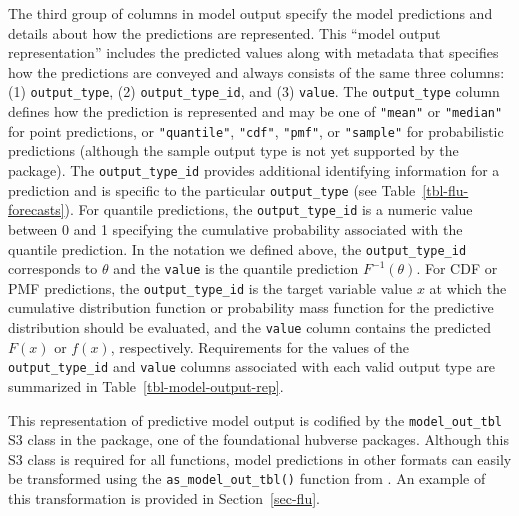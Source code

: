 \documentclass[
  article,
  shortnames,
  notitle]{jss}
\begin{document}
\begin{longtable}[]
\caption{\label{tbl-example-scenarios}Example of scenario projections
for incident COVID-19 cases, formatted according to hubverse standards.
Quantile predictions for the median and 50\% prediction intervals from a
single model are shown for four distinct scenarios. The
\texttt{location} and \texttt{origin\_date} columns have been omitted
for brevity; all forecasts in this example were made on 2021-03-07 for
the US. This example is a subset of the \texttt{scenario\_outputs} data
provided by the  package.}

\tabularnewline
\end{longtable}

The third group of columns in model output specify the model predictions
and details about how the predictions are represented. This ``model
output representation'' includes the predicted values along with
metadata that specifies how the predictions are conveyed and always
consists of the same three columns: (1) \texttt{output\_type}, (2)
\texttt{output\_type\_id}, and (3) \texttt{value}. The
\texttt{output\_type} column defines how the prediction is represented
and may be one of \texttt{"mean"} or \texttt{"median"} for point
predictions, or \texttt{"quantile"}, \texttt{"cdf"}, \texttt{"pmf"}, or
\texttt{"sample"} for probabilistic predictions (although the sample
output type is not yet supported by the  package). The
\texttt{output\_type\_id} provides additional identifying information
for a prediction and is specific to the particular \texttt{output\_type}
(see Table~\ref{tbl-flu-forecasts}). For quantile predictions, the
\texttt{output\_type\_id} is a numeric value between 0 and 1 specifying
the cumulative probability associated with the quantile prediction. In
the notation we defined above, the \texttt{output\_type\_id} corresponds
to \(\theta\) and the \texttt{value} is the quantile prediction
\(F^{-1}(\theta)\). For CDF or PMF predictions, the
\texttt{output\_type\_id} is the target variable value \(x\) at which
the cumulative distribution function or probability mass function for
the predictive distribution should be evaluated, and the \texttt{value}
column contains the predicted \(F(x)\) or \(f(x)\), respectively.
Requirements for the values of the \texttt{output\_type\_id} and
\texttt{value} columns associated with each valid output type are
summarized in Table~\ref{tbl-model-output-rep}.

This representation of predictive model output is codified by the
\texttt{model\_out\_tbl} S3 class in the  package, one of
the foundational hubverse packages. Although this S3 class is required
for all  functions, model predictions in other formats
can easily be transformed using the \texttt{as\_model\_out\_tbl()}
function from . An example of this transformation is
provided in Section~\ref{sec-flu}.
\end{document}
